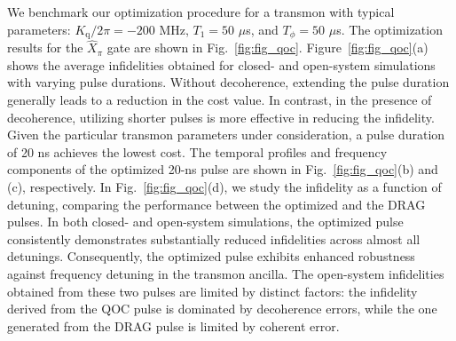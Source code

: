 \documentclass[12pt]{article}
\begin{document}
We benchmark our optimization procedure for a transmon with typical parameters: $K_\text{q}/2\pi=-200$ MHz, $T_1=50$ $\mu$s, and $T_\phi=50$ $\mu$s. The optimization results for the $\hat{X}_\pi$ gate are shown in Fig.\ \ref{fig:fig_qoc}. 
Figure~\ref{fig:fig_qoc}(a) shows the average infidelities obtained for closed- and open-system simulations with varying pulse durations. 
Without decoherence, extending the pulse duration generally leads to a reduction in the cost value. In contrast, in the presence of decoherence, utilizing shorter pulses is more effective in reducing the infidelity. 
Given the particular transmon parameters under consideration, a pulse duration of 20 ns achieves the lowest cost.
The temporal profiles and frequency components of the optimized 20-ns pulse are shown in Fig.\ \ref{fig:fig_qoc}(b) and (c), respectively.
In Fig.~\ref{fig:fig_qoc}(d), we study the infidelity as a function of detuning, comparing the performance between the optimized and the DRAG pulses. 
In both closed- and open-system simulations, the optimized pulse consistently demonstrates substantially reduced infidelities across almost all detunings. 
Consequently, the optimized pulse exhibits enhanced robustness against frequency detuning in the transmon ancilla. 
The open-system infidelities obtained from these two pulses are limited by distinct factors: the infidelity derived from the QOC pulse is dominated by decoherence errors, while the one generated from the DRAG pulse is limited by coherent error. 
\end{document}
